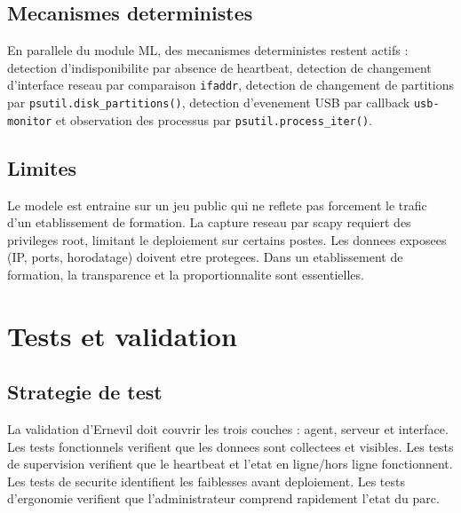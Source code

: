 \documentclass[12pt,a4paper]{report}
\begin{document}
\section{Mecanismes deterministes}
En parallele du module ML, des mecanismes deterministes restent actifs : detection d'indisponibilite par absence de heartbeat, detection de changement d'interface reseau par comparaison \texttt{ifaddr}, detection de changement de partitions par \texttt{psutil.disk\_partitions()}, detection d'evenement USB par callback \texttt{usb-monitor} et observation des processus par \texttt{psutil.process\_iter()}.

\section{Limites}
Le modele est entraine sur un jeu public qui ne reflete pas forcement le trafic d'un etablissement de formation. La capture reseau par scapy requiert des privileges root, limitant le deploiement sur certains postes. Les donnees exposees (IP, ports, horodatage) doivent etre protegees. Dans un etablissement de formation, la transparence et la proportionnalite sont essentielles.

\chapter{Tests et validation}

\section{Strategie de test}
La validation d'Ernevil doit couvrir les trois couches : agent, serveur et interface. Les tests fonctionnels verifient que les donnees sont collectees et visibles. Les tests de supervision verifient que le heartbeat et l'etat en ligne/hors ligne fonctionnent. Les tests de securite identifient les faiblesses avant deploiement. Les tests d'ergonomie verifient que l'administrateur comprend rapidement l'etat du parc.
\end{document}
